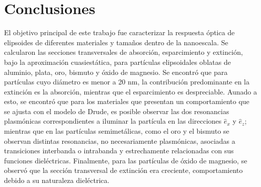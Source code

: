 \section{Conclusiones}

El objetivo principal de este trabajo fue caracterizar la respuesta óptica de elipsoides de diferentes materiales y tamaños dentro de la nanoescala. Se calcularon las secciones transversales de absorción, esparcimiento y extinción, bajo la aproximación cuasiestática, para partículas elipsoidales oblatas de aluminio, plata, oro, bismuto y óxido de magnesio. Se encontró que para partículas cuyo diámetro es menor a 20 nm, la contribución predominante en la extinción es la absorción, mientras que el esparcimiento es despreciable. Aunado a esto, se encontró que para los materiales que presentan un comportamiento que se ajusta con el modelo de Drude, es posible observar las dos resonancias plasmónicas correspondientes a iluminar la partícula en las direcciones $\hat{e}_x$ y $\hat{e}_z$; mientras que en las partículas semimetálicas, como el oro y el bismuto se observan distintas resonancias, no necesariamente plasmónicas, asociadas a transiciones interbanda o intrabanda y estrechamente relacionadas con sus funciones dieléctricas. Finalmente, para las partículas de óxido de magnesio, se observó que la sección transversal de extinción era creciente, comportamiento debido a su naturaleza dieléctrica.

